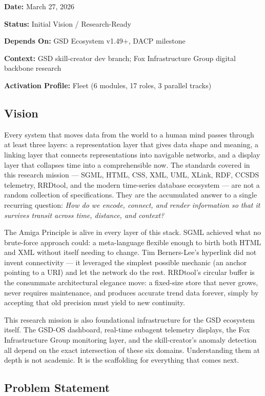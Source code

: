 \documentclass[11pt,letterpaper]{article}
\newcommand{\metafield}[2]{\textbf{\sffamily #1} #2\par}
\begin{document}
\metafield{Date:}{March 27, 2026}
\metafield{Status:}{Initial Vision / Research-Ready}
\metafield{Depends On:}{GSD Ecosystem v1.49+, DACP milestone}
\metafield{Context:}{GSD skill-creator dev branch; Fox Infrastructure Group digital backbone research}
\metafield{Activation Profile:}{Fleet (6 modules, 17 roles, 3 parallel tracks)}

\subsection{Vision}

Every system that moves data from the world to a human mind passes through at least three layers: a representation layer that gives data shape and meaning, a linking layer that connects representations into navigable networks, and a display layer that collapses time into a comprehensible now. The standards covered in this research mission --- SGML, HTML, CSS, XML, UML, XLink, RDF, CCSDS telemetry, RRDtool, and the modern time-series database ecosystem --- are not a random collection of specifications. They are the accumulated answer to a single recurring question: \emph{How do we encode, connect, and render information so that it survives transit across time, distance, and context?}

The Amiga Principle is alive in every layer of this stack. SGML achieved what no brute-force approach could: a meta-language flexible enough to birth both HTML and XML without itself needing to change. Tim Berners-Lee's hyperlink did not invent connectivity --- it leveraged the simplest possible mechanic (an anchor pointing to a URI) and let the network do the rest. RRDtool's circular buffer is the consummate architectural elegance move: a fixed-size store that never grows, never requires maintenance, and produces accurate trend data forever, simply by accepting that old precision must yield to new continuity.

This research mission is also foundational infrastructure for the GSD ecosystem itself. The GSD-OS dashboard, real-time subagent telemetry displays, the Fox Infrastructure Group monitoring layer, and the skill-creator's anomaly detection all depend on the exact intersection of these six domains. Understanding them at depth is not academic. It is the scaffolding for everything that comes next.

\subsection{Problem Statement}
\end{document}
